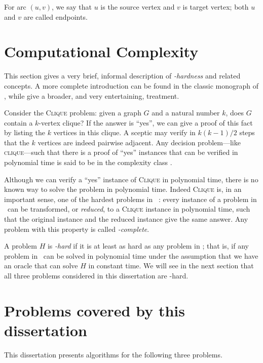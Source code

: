 For arc $(u,v)$, we say that $u$ is the source vertex and $v$ is target vertex; both
$u$ and $v$ are called endpoints.

\section{Computational Complexity}\label{sec:complexity}

This section gives a very brief, informal description of
\emph{\NP-hardness} and related concepts. A more complete introduction can be
found in the classic monograph of \citet{DBLP:books/fm/GareyJ79},
while \citet{moore2011nature} give a broader, and very entertaining,
treatment.

Consider the \textsc{Clique} problem: given a graph $G$ and a natural number $k$,
does $G$ contain a $k$-vertex clique?  If the answer is ``yes'', we can give a proof
of this fact by listing the $k$ vertices in this clique.  A sceptic may verify
in $k(k-1)/2$ steps that the $k$ vertices are indeed pairwise adjacent.  Any decision
problem---like \textsc{clique}---such that there is a proof of ``yes'' instances
that can be verified in polynomial time is said to be in the complexity class \NP.

Although we can verify a ``yes'' instance of \textsc{Clique} in polynomial
time, there is no known way to solve the problem in polynomial time.
Indeed \textsc{Clique} is, in an important sense, one of the hardest problems in \NP\
\citep{DBLP:conf/coco/Karp72}: every instance of a problem in \NP\ can be
transformed, or \emph{reduced}, to a \textsc{Clique} instance in polynomial
time, such that the original instance and the reduced instance give the same
answer.  Any problem with this property is called \emph{\NP-complete}.

A problem $H$ is \emph{\NP-hard} if it is at least as hard as any problem in \NP;
that is, if any problem in \NP\ can be solved in polynomial time under the assumption
that we have an oracle that can solve $H$ in constant time.  We will see in the next
section that all three problems considered in this dissertation are \NP-hard.

\section{Problems covered by this dissertation}\label{sec:problems}

This dissertation presents algorithms for the following three problems.


